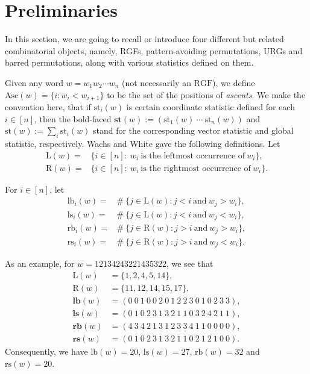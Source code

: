 \documentclass[12pt]{amsart}
\numberwithin{equation}{section}
\theoremstyle{plain}
\theoremstyle{definition}
\def\RGF{\mathrm{RGF}}
\def\lb{\mathrm{lb}}
\def\ls{\mathrm{ls}}
\def\rb{\mathrm{rb}}
\def\rs{\mathrm{rs}}
\def\Asc{\mathrm{Asc}}
\def\LL{\mathrm{L}}
\def\RR{\mathrm{R}}
\def\st{\mathrm{st}}
\def\bst{\mathbf{st}}
\def\blb{\mathbf{lb}}
\def\bls{\mathbf{ls}}
\def\brb{\mathbf{rb}}
\def\brs{\mathbf{rs}}
\def\st{\mathrm{st}}
\begin{document}
\section{Preliminaries}\label{sec:pre}

In this section, we are going to recall or introduce four different but related combinatorial objects, namely, RGFs, pattern-avoiding permutations, URGs and barred permutations, along with various statistics defined on them.

Given any word $w=w_1 w_2 \cdots w_n$ (not necessarily an $\RGF$),
we define $\Asc(w) =\{i: w_i < w_{i+1}\}$ to be
the set of the positions of \emph{ascents}. We make the convention here, that if $\st_i(w)$ is certain coordinate statistic defined for each $i\in[n]$, then the bold-faced $\bst(w):=(\st_1(w)~\cdots~\st_n(w))$ and $\st(w):=\sum_i\st_i(w)$ stand for the corresponding vector statistic and global statistic, respectively.
Wachs and White\cite{WW} gave the following definitions. Let
\begin{align*}
  \LL(w)=&\{i \in [n]:~ w_i~ \text{is the leftmost occurrence of}~ w_i\},\\[5pt]
   \RR(w)=&\{i \in [n]:~ w_i~ \text{is the rightmost occurrence of}~ w_i\}.
\end{align*}

For $i \in [n]$, let
\begin{align*}
   \lb_i(w)=&\#~\{j \in \LL(w): j<i ~\text{and}~ w_j > w_i\}, \\[5pt]
  \ls_i(w)=&\#~\{j \in \LL(w): j<i ~\text{and}~ w_j < w_i\}, \\[5pt]
  \rb_i(w)=&\#~\{j \in \RR(w): j>i ~\text{and}~ w_j > w_i\}, \\[5pt]
  \rs_i(w)=&\#~\{j \in \RR(w): j>i ~\text{and}~ w_j < w_i\}.
\end{align*}









As an example, for $w=12134243221435322$, we see that
\begin{align*}
  \LL(w) &=\{1,2,4,5,14\},\\[5pt]
  \RR(w) &=\{11,12,14,15,17\},\\[5pt]
  \blb(w)&= (0~0~1~0~0~2~0~1~2~2~3~0~1~0~2~3~3), \\[5pt]
  \bls(w)&= (0~1~0~2~3~1~3~2~1~1~0~3~2~4~2~1~1), \\[5pt]
  \brb(w)&= (4~3~4~2~1~3~1~2~3~3~4~1~1~0~0~0~0), \\[5pt]
  \brs(w)&= (0~1~0~2~3~1~3~2~1~1~0~2~1~2~1~0~0).
\end{align*}
Consequently, we have $\lb(w)=20$, $\ls(w)=27$, $\rb(w)=32$ and $\rs(w)=20$.
\end{document}
